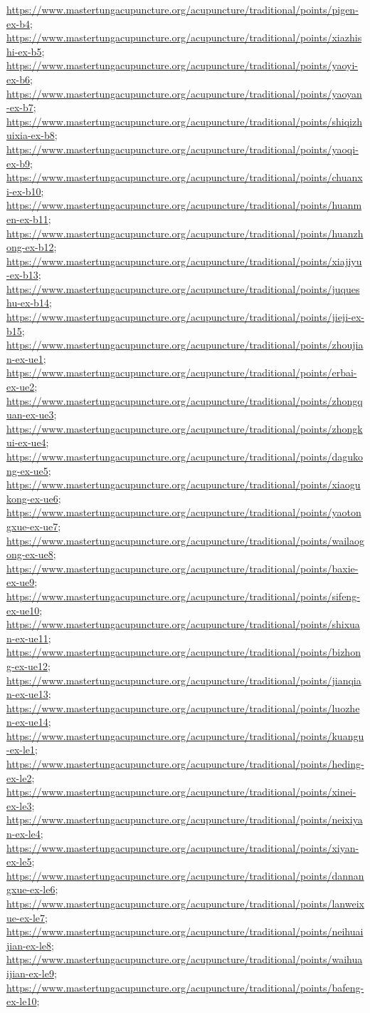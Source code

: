 \documentclass[12pt,a4paper]{article}
\begin{document}
\begin{itemize}
\url{https://www.mastertungacupuncture.org/acupuncture/traditional/points/pigen-ex-b4}; \url{https://www.mastertungacupuncture.org/acupuncture/traditional/points/xiazhishi-ex-b5}; \url{https://www.mastertungacupuncture.org/acupuncture/traditional/points/yaoyi-ex-b6}; \url{https://www.mastertungacupuncture.org/acupuncture/traditional/points/yaoyan-ex-b7}; \url{https://www.mastertungacupuncture.org/acupuncture/traditional/points/shiqizhuixia-ex-b8}; \url{https://www.mastertungacupuncture.org/acupuncture/traditional/points/yaoqi-ex-b9}; \url{https://www.mastertungacupuncture.org/acupuncture/traditional/points/chuanxi-ex-b10}; \url{https://www.mastertungacupuncture.org/acupuncture/traditional/points/huanmen-ex-b11}; \url{https://www.mastertungacupuncture.org/acupuncture/traditional/points/huanzhong-ex-b12}; \url{https://www.mastertungacupuncture.org/acupuncture/traditional/points/xiajiyu-ex-b13}; \url{https://www.mastertungacupuncture.org/acupuncture/traditional/points/juqueshu-ex-b14}; \url{https://www.mastertungacupuncture.org/acupuncture/traditional/points/jieji-ex-b15}; \url{https://www.mastertungacupuncture.org/acupuncture/traditional/points/zhoujian-ex-ue1}; \url{https://www.mastertungacupuncture.org/acupuncture/traditional/points/erbai-ex-ue2}; \url{https://www.mastertungacupuncture.org/acupuncture/traditional/points/zhongquan-ex-ue3}; \url{https://www.mastertungacupuncture.org/acupuncture/traditional/points/zhongkui-ex-ue4}; \url{https://www.mastertungacupuncture.org/acupuncture/traditional/points/dagukong-ex-ue5}; \url{https://www.mastertungacupuncture.org/acupuncture/traditional/points/xiaogukong-ex-ue6}; \url{https://www.mastertungacupuncture.org/acupuncture/traditional/points/yaotongxue-ex-ue7}; \url{https://www.mastertungacupuncture.org/acupuncture/traditional/points/wailaogong-ex-ue8}; \url{https://www.mastertungacupuncture.org/acupuncture/traditional/points/baxie-ex-ue9}; \url{https://www.mastertungacupuncture.org/acupuncture/traditional/points/sifeng-ex-ue10}; \url{https://www.mastertungacupuncture.org/acupuncture/traditional/points/shixuan-ex-ue11}; \url{https://www.mastertungacupuncture.org/acupuncture/traditional/points/bizhong-ex-ue12}; \url{https://www.mastertungacupuncture.org/acupuncture/traditional/points/jianqian-ex-ue13}; \url{https://www.mastertungacupuncture.org/acupuncture/traditional/points/luozhen-ex-ue14}; \url{https://www.mastertungacupuncture.org/acupuncture/traditional/points/kuangu-ex-le1}; \url{https://www.mastertungacupuncture.org/acupuncture/traditional/points/heding-ex-le2}; \url{https://www.mastertungacupuncture.org/acupuncture/traditional/points/xinei-ex-le3}; \url{https://www.mastertungacupuncture.org/acupuncture/traditional/points/neixiyan-ex-le4}; \url{https://www.mastertungacupuncture.org/acupuncture/traditional/points/xiyan-ex-le5}; \url{https://www.mastertungacupuncture.org/acupuncture/traditional/points/dannangxue-ex-le6}; \url{https://www.mastertungacupuncture.org/acupuncture/traditional/points/lanweixue-ex-le7}; \url{https://www.mastertungacupuncture.org/acupuncture/traditional/points/neihuaijian-ex-le8}; \url{https://www.mastertungacupuncture.org/acupuncture/traditional/points/waihuaijian-ex-le9}; \url{https://www.mastertungacupuncture.org/acupuncture/traditional/points/bafeng-ex-le10}; 
\end{itemize}
\end{document}
